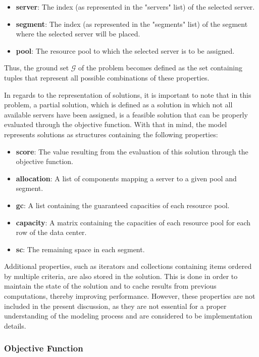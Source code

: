\begin{itemize}
  \item \textbf{server}: The index (as represented in the "servers" list) of the selected server.
  \item \textbf{segment}: The index (as represented in the "segments" list) of
        the segment where the selected server will be placed.
  \item \textbf{pool}: The resource pool to which the selected server is to be assigned.
\end{itemize}

Thus, the ground set $\mathcal{G}$ of the problem becomes defined as the set
containing tuples that represent all possible combinations of
these properties.

In regards to the representation of solutions, it is important to note that in
this problem, a partial solution, which is defined as a solution in which not
all available servers have been assigned, is a feasible solution that can be
properly evaluated through the objective function. With that in mind, the model
represents solutions as structures containing the following properties:

\begin{itemize}
  \item \textbf{score}: The value resulting from the evaluation of this solution
        through the objective function.
  \item \textbf{allocation}: A list of components mapping a server to a given pool and segment.
  \item \textbf{gc}: A list containing the guaranteed capacities of each resource pool.
  \item \textbf{capacity}: A matrix containing the capacities of each resource pool
        for each row of the data center.
  \item \textbf{sc}: The remaining space in each segment.
\end{itemize}

Additional properties, such as iterators and collections containing items
ordered by multiple criteria, are also stored in the solution. This is done in
order to maintain the state of the solution and to cache results from previous
computations, thereby improving performance. However, these properties are not
included in the present discussion, as they are not essential for a proper
understanding of the modeling process and are considered to be implementation
details.

\subsubsection{Objective Function}
\label{section:data-center-objective-function}

